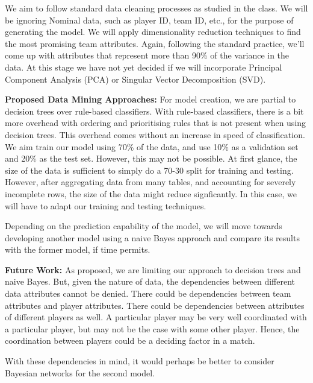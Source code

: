 \documentclass[11pt, letterpaper]{article}
\begin{document}
We aim to follow standard data cleaning processes as studied in the class.
We will be ignoring Nominal data, such as player ID, team ID, etc., for the purpose of generating the model.
We will apply dimensionality reduction techniques to find the most promising team attributes.
Again, following the standard practice, we'll come up with attributes that represent more than 90\% of the variance in the data.
At this stage we have not yet decided if we will incorporate Principal Component Analysis (PCA) or Singular Vector Decomposition (SVD).

\textbf{Proposed Data Mining Approaches:} For model creation, we are partial to decision trees over rule-based classifiers.
With rule-based classifiers, there is a bit more overhead with ordering and prioritising rules that is not present when using decision trees.
This overhead comes without an increase in speed of classification.
We aim train our model using 70\% of the data, and use 10\% as a validation set and 20\% as the test set.
However, this may not be possible.
At first glance, the size of the data is sufficient to simply do a 70-30 split for training and testing.
However, after aggregating data from many tables, and accounting for severely incomplete rows, the size of the data might reduce signficantly.
In this case, we will have to adapt our training and testing techniques.

Depending on the prediction capability of the model, we will move towards developing another model using a naive Bayes approach and compare its results with the former model, if time permits.

\textbf{Future Work:} As proposed, we are limiting our approach to decision trees and naive Bayes.
But, given the nature of data, the dependencies between different data attributes cannot be denied. There could be dependencies between team attributes and player attributes.
There could be dependencies between attributes of different players as well.
A particular player may be very well coordinated with a particular player, but may not be the case with some other player.
Hence, the coordination between players could be a deciding factor in a match.

With these dependencies in mind, it would perhaps be better to consider Bayesian networks for the second model.



\end{document}
